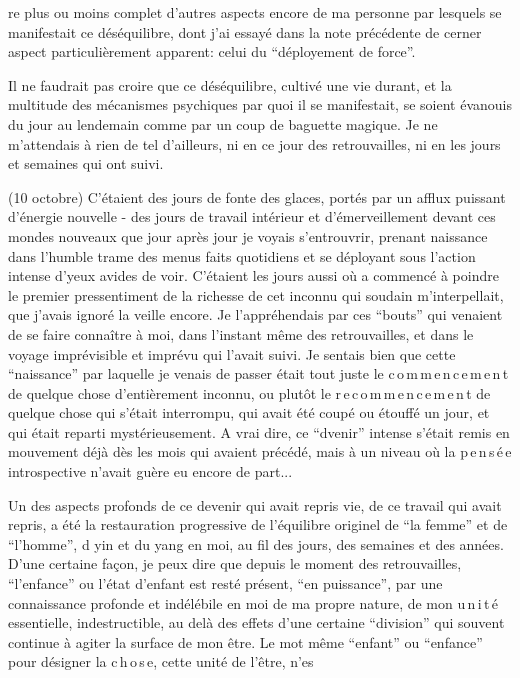 re plus ou moins complet d'autres aspects encore de ma personne par lesquels se manifestait ce déséquilibre, dont j'ai essayé dans la note précédente de cerner aspect particulièrement apparent: celui du ``déployement de force''.

Il ne faudrait pas croire que ce déséquilibre, cultivé une vie durant, et la multitude des mécanismes psychiques par quoi il se manifestait, se soient évanouis du jour au lendemain comme par un coup de baguette magique. Je ne m'attendais à rien de tel d'ailleurs, ni en ce jour des retrouvailles, ni en les jours et semaines qui ont suivi.

(10 octobre) C'étaient des jours de fonte des glaces, portés par un afflux puissant d'énergie nouvelle - des jours de travail intérieur et d'émerveillement devant ces mondes nouveaux que jour après jour je voyais s'entrouvrir, prenant naissance dans l'humble trame des menus faits quotidiens et se déployant sous l'action intense d'yeux avides de voir. C'étaient les jours aussi où a commencé à poindre le premier pressentiment de la richesse de cet inconnu qui soudain m'interpellait, que j'avais ignoré la veille encore. Je l'appréhendais par ces ``bouts'' qui venaient de se faire connaître à moi, dans l'instant même des retrouvailles, et dans le voyage imprévisible et imprévu qui l'avait suivi. Je sentais bien que cette ``naissance'' par laquelle je venais de passer était tout juste le c\,o\,m\,m\,e\,n\,c\,e\,m\,e\,n\,t de quelque chose d'entièrement inconnu, ou plutôt le r\,e\,c\,o\,m\,m\,e\,n\,c\,e\,m\,e\,n\,t de quelque chose qui s'était interrompu, qui avait été coupé ou étouffé un jour, et qui était reparti mystérieusement. A vrai dire, ce ``dvenir'' intense s'était remis en mouvement déjà dès les mois qui avaient précédé, mais à un niveau où la p\,e\,n\,s\,é\,e introspective n'avait guère eu encore de part...

Un des aspects profonds de ce devenir qui avait repris vie, de ce travail qui avait repris, a été la restauration progressive de l'équilibre originel de ``la femme'' et de ``l'homme'', d yin et du yang en moi, au fil des jours, des semaines et des années. D'une certaine façon, je peux dire que depuis le moment des retrouvailles, ``l'enfance'' ou l'état d'enfant est resté présent, ``en puissance'', par une connaissance profonde et indélébile en moi de ma propre nature, de mon u\,n\,i\,t\,é essentielle, indestructible, au delà des effets d'une certaine ``division'' qui souvent continue à agiter la surface de mon être. Le mot même ``enfant'' ou ``enfance'' pour désigner la c\,h\,o\,s\,e, cette unité de l'être, n'es\margin{\unsure{-}}
